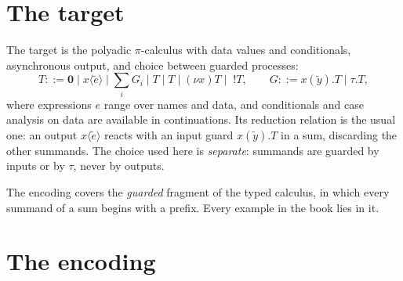 \documentclass[11pt,openany]{book}
\theoremstyle{remark}
\begin{document}
\section{The target}

The target is the polyadic $\pi$-calculus with data values and
conditionals, asynchronous output, and choice between guarded processes:
\[
T ::= \mathbf 0 \mid x\langle\tilde e\rangle \mid \textstyle\sum_i G_i
\mid T\mid T \mid (\nu x)T \mid\; !T,
\qquad
G ::= x(\tilde y).T \mid \tau.T,
\]
where expressions $e$ range over names and data, and conditionals and
case analysis on data are available in continuations. Its reduction
relation is the usual one: an output $x\langle\tilde e\rangle$ reacts with
an input guard $x(\tilde y).T$ in a sum, discarding the other summands. The
choice used here is \emph{separate}: summands are guarded by inputs or by
$\tau$, never by outputs.

The encoding covers the \emph{guarded} fragment of the typed calculus, in
which every summand of a sum begins with a prefix. Every example in the
book lies in it.

\section{The encoding}
\end{document}
